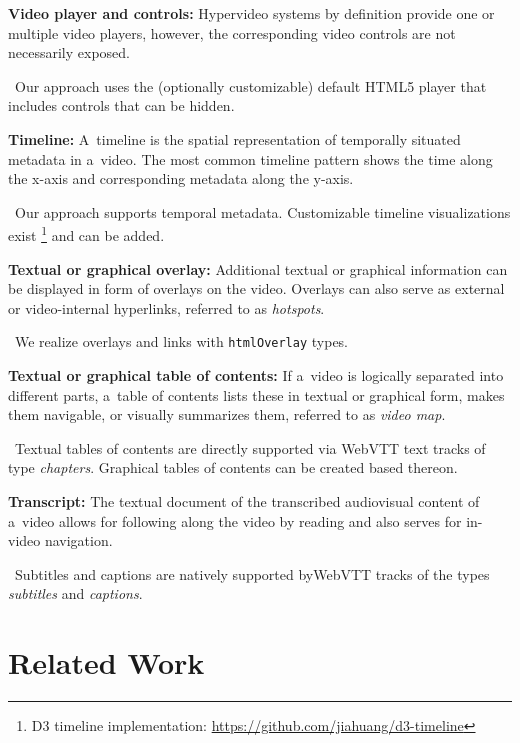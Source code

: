 \documentclass{sig-alternate}
\newcommand{\inlinelistingsize}{\fontsize{8pt}{11pt}}
\let\oldurl\url
\renewcommand{\url}[1]{\inlinelistingsize\oldurl{#1}}
\begin{document}
\noindent \textbf{Video player and controls:} Hypervideo systems by definition
  provide one or multiple video players, however,
  the corresponding video controls are not necessarily exposed.

\checkmark~Our approach uses the (optionally customizable)
default HTML5 player that includes controls that can be hidden.

\noindent \textbf{Timeline:} A~timeline is the spatial representation
  of temporally situated metadata in a~video.
  The most common timeline pattern shows the
  time along the x-axis and corresponding metadata along the y-axis.
  
\checkmark~Our approach supports temporal metadata.
Customizable timeline visualizations exist%
\footnote{D3 timeline implementation:
\url{https://github.com/jiahuang/d3-timeline}}
and can be added.

\noindent \textbf{Textual or graphical overlay:}
  Additional textual or gra\-phical
  information can be displayed in form of overlays on the video.
  Overlays can also serve as external or video-internal hyperlinks,
  referred to as \emph{hotspots}.

\checkmark~We realize overlays and links
with \texttt{htmlOverlay} types.

\noindent \textbf{Textual or graphical table of contents:}
  If a~video is logically separated
  into different parts, a~table of contents lists these
  in textual or graphical form, makes them navigable,
  or visually summarizes them, referred to as \emph{video map}.
  
\checkmark~Textual tables of contents are directly supported
via WebVTT text tracks of type \emph{chapters}.
Graphical tables of contents can be created based thereon.  

\noindent \textbf{Transcript:} The textual document
  of the transcribed audiovisual content of a~video
  allows for following along the video by reading
  and also serves for in-video navigation.
  
\checkmark~Subtitles and captions are natively supported
by\linebreak WebVTT tracks of the types \emph{subtitles} and \emph{captions}.

\section{Related Work}
\end{document}
